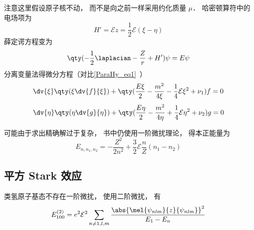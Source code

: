 

注意这里假设原子核不动， 而不是向之前一样采用约化质量 $\mu$． 哈密顿算符中的电场项为
\begin{equation}
H' = \mathcal Ez = \frac12 \mathcal E (\xi - \eta)
\end{equation}
薛定谔方程变为
\begin{equation}
\qty(-\frac12 \laplacian - \frac{Z}{r} + H')\psi = E\psi
\end{equation}
分离变量法得微分方程（对比\autoref{ParaHy_eq1}~）
\begin{equation}
\dv{\xi} \qty(\xi \dv{f}{\xi}) + \qty(\frac{E \xi}{2} - \frac{m^2}{4\xi} -\frac14\mathcal E \xi^2 + \nu_1) f = 0
\end{equation}
\begin{equation}
\dv{\eta}\qty(\eta \dv{g}{\eta}) + \qty(\frac{E\eta}{2} - \frac{m^2}{4\eta} +\frac14\mathcal E \eta^2 + \nu_2)g = 0
\end{equation}

可能由于求出精确解过于复杂， 书中仍使用一阶微扰理论， 得本正能量为
\begin{equation}
E_{n,n_1,n_2} = -\frac{Z^2}{2n^2} + \frac32 \mathcal E \frac{n}{Z}(n_1 - n_2)
\end{equation}

\subsection{平方 Stark 效应}
类氢原子基态不存在一阶微扰， 使用二阶微扰， 有
\begin{equation}
E_{100}^{(2)} = e^2\mathcal E^2 \sum_{n\ne 1, l, m} \frac{\abs{\mel{\psi_{nlm}}{z}{\psi_{nlm}}}^2}{E_1 - E_n}
\end{equation}

